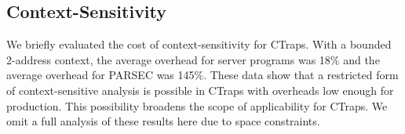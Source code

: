 \documentclass[preprint,9pt]{sigplanconf}
\newcommand{\addtodo}[1]{\textcolor{red}{[To do: #1]}}
\newcommand{\ctraps}{CTraps\xspace}
\newcommand{\lwt}{LWT\xspace}
\begin{document}
%
%
%






\subsection{Context-Sensitivity}
We briefly evaluated the cost of context-sensitivity for \ctraps.  With a
bounded 2-address context, the average overhead for server programs was 18\%
and the average overhead for PARSEC was 145\%.  These data show that a
restricted form of context-sensitive analysis is possible in \ctraps with
overheads low enough for production.  This possibility broadens the scope of
applicability for \ctraps.  We omit a full analysis of these results here due
to space constraints.
\end{document}
